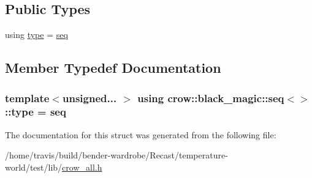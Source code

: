 \subsection*{Public Types}
\begin{DoxyCompactItemize}
\item 
using \hyperlink{structcrow_1_1black__magic_1_1seq_a74cdbe83d79d3f3c92d07f044e3e2b84}{type} = \hyperlink{structcrow_1_1black__magic_1_1seq}{seq}
\end{DoxyCompactItemize}


\subsection{Member Typedef Documentation}
\hypertarget{structcrow_1_1black__magic_1_1seq_a74cdbe83d79d3f3c92d07f044e3e2b84}{
\subsubsection[{type}]{\setlength{\rightskip}{0pt plus 5cm}template$<$unsigned... $>$ using {\bf crow\-::black\-\_\-magic\-::seq}$<$$>$\-::{\bf type} =  {\bf seq}}}\label{structcrow_1_1black__magic_1_1seq_a74cdbe83d79d3f3c92d07f044e3e2b84}


The documentation for this struct was generated from the following file\-:\begin{DoxyCompactItemize}
\item 
/home/travis/build/bender-\/wardrobe/\-Recast/temperature-\/world/test/lib/\hyperlink{crow__all_8h}{crow\-\_\-all.\-h}\end{DoxyCompactItemize}
